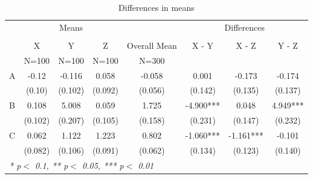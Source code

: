 
\begin{table}[!ht]
  \centering
  \caption{Differences in means}
  \label{table:differencesinmeans}
\begin{tabular}{lccccccc}
  \toprule
  \toprule
  & \multicolumn{3}{c}{Means} & \multicolumn{1}{c}{} & \multicolumn{3}{c}{Differences} \\
  \cmidrule(lr){2-4}\cmidrule(lr){6-8} \\
   & X & Y & Z & Overall Mean & X - Y & X - Z & Y - Z\\
   & N=100 & N=100 & N=100 & N=300 &  &  & \\
  \midrule
  A & -0.12 & -0.116 & 0.058 & -0.058 & 0.001 & -0.173 & -0.174 \\
   & (0.10) & (0.102) & (0.092) & (0.056) & (0.142) & (0.135) & (0.137) \\
  B & 0.108 & 5.008 & 0.059 & 1.725 & -4.900*** & 0.048 & 4.949*** \\
   & (0.102) & (0.207) & (0.105) & (0.158) & (0.231) & (0.147) & (0.232) \\
  C & 0.062 & 1.122 & 1.223 & 0.802 & -1.060*** & -1.161*** & -0.101 \\
   & (0.082) & (0.106) & (0.091) & (0.062) & (0.134) & (0.123) & (0.140) \\
  \bottomrule
  \multicolumn{8}{l}{{\small \textit{* p$<$ 0.1, ** p$<$ 0.05, *** p$<$ 0.01}}}\\
\end{tabular}
\end{table}
